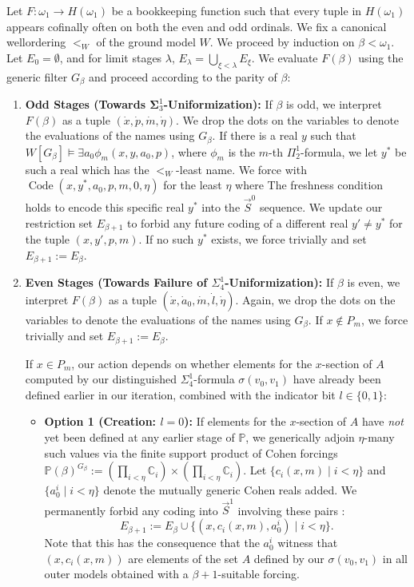 \documentclass{article}
\theoremstyle{plain}
\theoremstyle{definition}
\newcommand{\forceP}{\mathbb{P}}
\newcommand{\code}{\operatorname{Code}}
\begin{document}
Let $F: \omega_1 \to H(\omega_1)$ be a bookkeeping function such that every tuple in $H(\omega_1)$ appears cofinally often on both the even and odd ordinals. We fix a canonical wellordering $<_W$ of the ground model $W$. We proceed by induction on $\beta < \omega_1$. Let $E_0 = \emptyset$, and for limit stages $\lambda$, $E_\lambda = \bigcup_{\xi < \lambda} E_\xi$.  We evaluate $F(\beta)$ using the generic filter $G_\beta$ and proceed according to the parity of $\beta$:

\begin{enumerate}
    \item \textbf{Odd Stages (Towards $\mathbf{\Sigma}^1_3$-Uniformization):}
    If $\beta$ is odd, we interpret $F(\beta)$ as a tuple $(\dot{x}, \dot{p}, \dot{m}, \dot{\eta})$. We drop the dots on the variables to denote the evaluations of the names using $G_{\beta}$. If there is a real $y$ such that $W[G_\beta] \models \exists a_0 \phi_m(x, y,a_0,p)$, where $\phi_m$ is the $m$-th $\Pi^1_2$-formula, we let $y^*$ be such a real  which has the  $<_W$-least name. We force with $\code(x, y^*,a_0,p, m, 0, \eta)$ for the least $\eta$ where The freshness condition holds to encode this specific real $y^*$ into the $\vec{S}^0$ sequence. We update our restriction set $E_{\beta+1}$ to forbid any future coding of a different real $y' \neq y^*$ for the tuple $(x, y',p, m)$. If no such $y^*$ exists, we force trivially and set $E_{\beta+1} := E_\beta$.

    \item \textbf{Even Stages (Towards Failure of $\Sigma^1_4$-Uniformization):}
    If $\beta$ is even, we interpret $F(\beta)$ as a tuple $(\dot{x}, \dot{a}_0, \dot{m}, \dot{l}, \dot{\eta})$. Again, we drop the dots on the variables to denote the evaluations of the names using $G_{\beta}$. If $x \notin P_m$, we force trivially and set $E_{\beta+1} := E_\beta$. 
    
    If $x \in P_m$, our action depends on whether elements for the $x$-section of $A$ computed by our distinguished $\Sigma^1_4$-formula $\sigma(v_0,v_1)$ have already been defined earlier in our iteration, combined with the indicator bit $l \in \{0, 1\}$:
    \begin{itemize}
        \item \textbf{Option 1 (Creation: $l = 0$):} If elements for the $x$-section of $A$ have \emph{not} yet been defined at any earlier stage of $\forceP$, we generically adjoin $\eta$-many such values via the finite support product of Cohen forcings $\forceP(\beta)^{G_\beta} := (\prod_{i<\eta} \mathbb{C}_i) \times (\prod_{i<\eta} \mathbb{C}_i)$. Let $\{c_i(x,m) \mid i < \eta\}$ and $\{a_0^i \mid i < \eta\}$ denote the mutually generic Cohen reals added. We permanently forbid any coding into $\vec{S}^1$ involving these pairs :
        \[ E_{\beta+1} := E_\beta \cup \big\{ (x, c_i(x,m), a_0^i) \mid i < \eta \big\}. \]
        Note that this has the consequence that the $a_0^i$ witness that $(x,c_i(x,m))$ are elements of the  set $A$ defined by our $\sigma(v_0,v_1)$ in all outer models obtained with a $\beta+1$-suitable forcing.
        

\end{itemize}
\end{enumerate}
\end{document}
